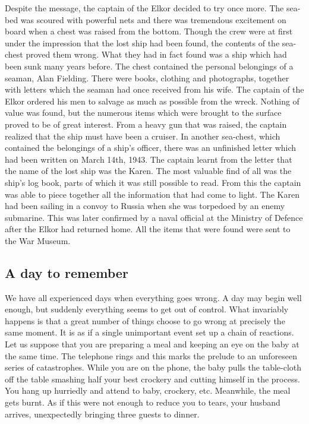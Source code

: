 \documentclass[11pt]{article}
\begin{document}
Despite the message, the captain of the Elkor decided to try once more. The sea-bed was scoured with powerful nets and there was tremendous excitement on board when a chest was raised from the bottom. Though the crew were at first under the impression that the lost ship had been found, the contents of the sea-chest proved them wrong. What they had in fact found was a ship which had been sunk many years before. The chest contained the personal belongings of a seaman, Alan Fielding. There were books, clothing and photographs, together with letters which the seaman had once received from his wife. The captain of the Elkor ordered his men to salvage as much as possible from the wreck. Nothing of value was found, but the numerous items which were brought to the surface proved to be of great interest. From a heavy gun that was raised, the captain realized that the ship must have been a cruiser. In another sea-chest, which contained the belongings of a ship's officer, there was an unfinished letter which had been written on March 14th, 1943. The captain learnt from the letter that the name of the lost ship was the Karen. The most valuable find of all was the ship's log book, parts of which it was still possible to read. From this the captain was able to piece together all the information that had come to light. The Karen had been sailing in a convoy to Russia when she was torpedoed by an enemy submarine. This was later confirmed by a naval official at the Ministry of Defence after the Elkor had returned home. All the items that were found were sent to the War Museum.
\subsection{A day to remember}
\label{sec-1-33}

We have all experienced days when everything goes wrong. A day may begin well enough, but suddenly everything seems to get out of control. What invariably happens is that a great number of things choose to go wrong at precisely the same moment. It is as if a single unimportant event set up a chain of reactions. Let us suppose that you are preparing a meal and keeping an eye on the baby at the same time. The telephone rings and this marks the prelude to an unforeseen series of catastrophes. While you are on the phone, the baby pulls the table-cloth off the table smashing half your best crockery and cutting himself in the process. You hang up hurriedly and attend to baby, crockery, etc. Meanwhile, the meal gets burnt. As if this were not enough to reduce you to tears, your husband arrives, unexpectedly bringing three guests to dinner.
\end{document}
